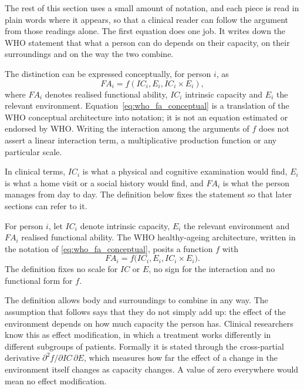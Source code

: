 The rest of this section uses a small amount of notation, and each piece is read in plain words where it appears, so that a clinical reader can follow the argument from those readings alone. The first equation does one job. It writes down the WHO statement that what a person can do depends on their capacity, on their surroundings and on the way the two combine.

The distinction can be expressed conceptually, for person $i$, as
\begin{equation}
\boxed{FA_i=f(IC_i,E_i,IC_i\times E_i)},
\label{eq:who_fa_conceptual}
\end{equation}
where $FA_i$ denotes realised functional ability, $IC_i$ intrinsic capacity and
$E_i$ the relevant environment. Equation~\ref{eq:who_fa_conceptual} is a
translation of the WHO conceptual architecture into notation; it is not an
equation estimated or endorsed by WHO. Writing the interaction among the
arguments of $f$ does not assert a linear interaction term, a multiplicative
production function or any particular scale.

In clinical terms, $IC_i$ is what a physical and cognitive examination would find, $E_i$ is what a home visit or a social history would find, and $FA_i$ is what the person manages from day to day. The definition below fixes the statement so that later sections can refer to it.

\begin{definition}
\label{def:lit-fa}
For person $i$, let $IC_i$ denote intrinsic capacity, $E_i$ the relevant
environment and $FA_i$ realised functional ability. The WHO healthy-ageing
architecture, written in the notation of \eqref{eq:who_fa_conceptual}, posits a
function $f$ with
\[
  FA_i=f\bigl(IC_i,E_i,IC_i\times E_i\bigr).
\]
The definition fixes no scale for $IC$ or $E$, no sign for the interaction and
no functional form for $f$. \citep{who_2015_ageing,who_healthy_ageing_2026}
\end{definition}

The definition allows body and surroundings to combine in any way. The assumption that follows says that they do not simply add up: the effect of the environment depends on how much capacity the person has. Clinical researchers know this as effect modification, in which a treatment works differently in different subgroups of patients. Formally it is stated through the cross-partial derivative $\partial^2 f/\partial IC\,\partial E$, which measures how far the effect of a change in the environment itself changes as capacity changes. A value of zero everywhere would mean no effect modification.

